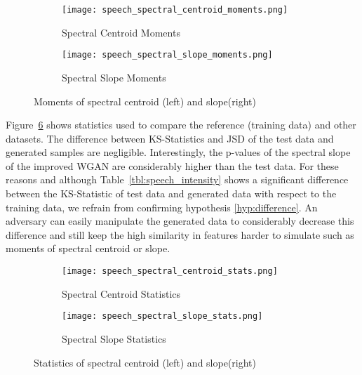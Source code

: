 \begin{figure}[!h]
    \centering
    \begin{subfigure}[b]{0.45\textwidth}
        \texttt{[image: speech\_spectral\_centroid\_moments.png]}
        \caption{Spectral Centroid Moments}
        \label{fig:speech_spectral_centroid_moments}
    \end{subfigure}
    \quad
    \begin{subfigure}[b]{0.45\textwidth}
        \texttt{[image: speech\_spectral\_slope\_moments.png]}
        \caption{Spectral Slope Moments}
        \label{fig:speech_spectral_slope_moments}
    \end{subfigure}
    \caption{Moments of spectral centroid (left) and slope(right)}
    \label{fig:speech_moments}
\end{figure}

Figure~\ref{fig:speech_spectral_stats} shows statistics used to compare the
reference (training data) and other datasets. The difference between
KS-Statistics and JSD of the test data and generated samples are negligible.
Interestingly, the p-values of the spectral slope of the improved WGAN are considerably
higher than the test data. For these reasons and although 
Table~\ref{tbl:speech_intensity} shows a significant difference between the 
KS-Statistic of test data and generated data with respect to the training
data, we refrain from confirming hypothesis \ref{hyp:difference}. An adversary
can easily manipulate the generated data to considerably decrease 
this difference and still keep the high similarity in features harder to
simulate such as moments of spectral centroid or slope. 

\begin{figure}[!h]
    \centering
    \begin{subfigure}[b]{.45\textwidth}
        \texttt{[image: speech\_spectral\_centroid\_stats.png]}
        \caption{Spectral Centroid Statistics}
        \label{fig:speech_spectral_centroid_stats}
    \end{subfigure}
    \quad
    \begin{subfigure}[b]{.45\textwidth}
        \texttt{[image: speech\_spectral\_slope\_stats.png]}
        \caption{Spectral Slope Statistics}
        \label{fig:speech_spectral_slope_stats}
    \end{subfigure}
    \caption{Statistics of spectral centroid (left) and slope(right)}
    \label{fig:speech_spectral_stats}
\end{figure}
